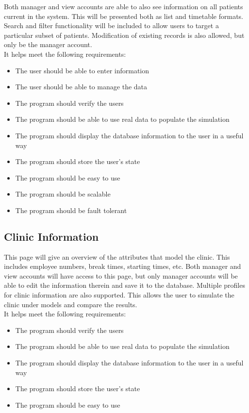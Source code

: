 \documentclass[12pt]{article}
\begin{document}
\noindent \newline
Both manager and view accounts are able to also see information on all patients current in the system. This will be presented both as list and timetable formats. Search and filter functionality will be included to allow users to target a particular subset of patients. Modification of existing records is also allowed, but only be the manager account.
\\
It helps meet the following requirements:
\begin{itemize}
	\item The user should be able to enter information
	\item The user should be able to manage the data
	\item The program should verify the users
	\item The program should be able to use real data to populate the simulation
	\item The program should display the database information to the user in a useful way
	\item The program should store the user's state
	\item The program should be easy to use
	\item The program should be scalable
	\item The program should be fault tolerant
\end{itemize}


\subsection{Clinic Information}
This page will give an overview of the attributes that model the clinic. This includes employee numbers, break times, starting times, etc. Both manager and view accounts will have access to this page, but only manager accounts will be able to edit the information therein and save it to the database. Multiple profiles for clinic information are also supported. This allows the user to simulate the clinic under models and compare the results.
\\
It helps meet the following requirements:
\begin{itemize}
	\item The program should verify the users
	\item The program should be able to use real data to populate the simulation
	\item The program should display the database information to the user in a useful way
	\item The program should store the user's state
	\item The program should be easy to use
\end{itemize}
\end{document}
